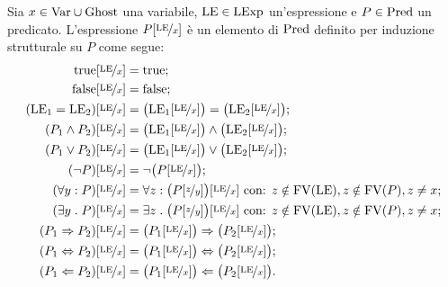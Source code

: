 \begin{definizione} 
Sia $x \in \mathrm{Var} \cup \mathrm{Ghost}$ una variabile, $\mathrm{LE} \in \mathrm{LExp}$ un'espressione
e $P \in \mathrm{Pred}$ un predicato.
L'espressione $P[\nicefrac{\mathrm{LE}}{x}]$ è un elemento di $\mathrm{Pred}$ definito
per induzione strutturale su $P$ come segue:
\begin{align*}
  \mathrm{true}[\nicefrac{\mathrm{LE}}{x}]
    &= \mathrm{true};\\
  \mathrm{false}[\nicefrac{\mathrm{LE}}{x}]
    &= \mathrm{false};\\
  (\mathrm{LE}_1 = \mathrm{LE}_2)[\nicefrac{\mathrm{LE}}{x}]
    &= \bigl(\mathrm{LE}_1[\nicefrac{\mathrm{LE}}{x}]\bigr) = \bigl(\mathrm{LE}_2[\nicefrac{\mathrm{LE}}{x}]\bigr);\\
  (P_1 \land P_2)[\nicefrac{\mathrm{LE}}{x}]
    &= \bigl(\mathrm{LE}_1[\nicefrac{\mathrm{LE}}{x}]\bigr) \land \bigl(\mathrm{LE}_2[\nicefrac{\mathrm{LE}}{x}]\bigr);\\
  (P_1 \lor P_2)[\nicefrac{\mathrm{LE}}{x}]
    &= \bigl(\mathrm{LE}_1[\nicefrac{\mathrm{LE}}{x}]\bigr) \lor \bigl(\mathrm{LE}_2[\nicefrac{\mathrm{LE}}{x}]\bigr);\\
  (\neg P)[\nicefrac{\mathrm{LE}}{x}]
    &= \neg \bigl(P [\nicefrac{\mathrm{LE}}{x}]\bigr);\\
  (\forall y\mathrel{:} P)[\nicefrac{\mathrm{LE}}{x}]
    &= \forall z\mathrel{:} \bigl(P [\nicefrac{z}{y}]\bigr)[\nicefrac{\mathrm{LE}}{x}] \text{ con: $z\notin\mathrm{FV}(\mathrm{LE}), z\notin\mathrm{FV}(P), z\neq x$};\\
  (\exists  y\mathrel{.} P)[\nicefrac{\mathrm{LE}}{x}]
    &= \exists z\mathrel{.} \bigl(P [\nicefrac{z}{y}]\bigr)[\nicefrac{\mathrm{LE}}{x}] \text{ con: $z\notin\mathrm{FV}(\mathrm{LE}), z\notin\mathrm{FV}(P), z\neq x$};\\
  (P_1 \Rightarrow P_2)[\nicefrac{\mathrm{LE}}{x}]
    &= \bigl(P_1[\nicefrac{\mathrm{LE}}{x}]\bigr) \Rightarrow \bigl(P_2[\nicefrac{\mathrm{LE}}{x}]\bigr);\\
  (P_1 \Leftrightarrow P_2)[\nicefrac{\mathrm{LE}}{x}]
    &= \bigl(P_1[\nicefrac{\mathrm{LE}}{x}]\bigr) \Leftrightarrow \bigl(P_2[\nicefrac{\mathrm{LE}}{x}]\bigr);\\
  (P_1 \Leftarrow P_2)[\nicefrac{\mathrm{LE}}{x}]
    &= \bigl(P_1[\nicefrac{\mathrm{LE}}{x}]\bigr) \Leftarrow \bigl(P_2[\nicefrac{\mathrm{LE}}{x}]\bigr).
\end{align*}
\end{definizione}

